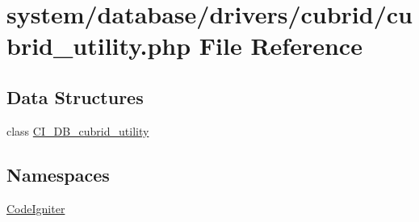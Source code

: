 \hypertarget{cubrid__utility_8php}{}\section{system/database/drivers/cubrid/cubrid\+\_\+utility.php File Reference}
\label{cubrid__utility_8php}
\subsection*{Data Structures}
\begin{DoxyCompactItemize}
\item 
class \mbox{\hyperlink{class_c_i___d_b__cubrid__utility}{C\+I\+\_\+\+D\+B\+\_\+cubrid\+\_\+utility}}
\end{DoxyCompactItemize}
\subsection*{Namespaces}
\begin{DoxyCompactItemize}
\item 
 \mbox{\hyperlink{namespace_code_igniter}{Code\+Igniter}}
\end{DoxyCompactItemize}
